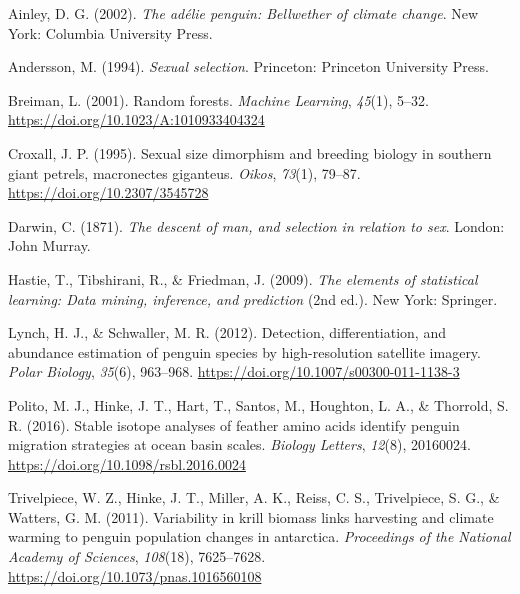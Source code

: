 \documentclass[
]{agujournal2019}
\newlength{\cslhangindent}
\newenvironment{CSLReferences}[2] %
 {\begin{list}{}{%
  \setlength{\itemindent}{0pt}
  \setlength{\leftmargin}{0pt}
  \setlength{\parsep}{0pt}
  \ifodd #1
   \setlength{\leftmargin}{\cslhangindent}
   \setlength{\itemindent}{-1\cslhangindent}
  \fi
  \setlength{\itemsep}{#2\baselineskip}}}
 {\end{list}}
\begin{document}
\label{refs}
\begin{CSLReferences}{1}{0}
\vspace{1em}

Ainley, D. G. (2002). \emph{The ad{é}lie penguin: Bellwether of climate
change}. New York: Columbia University Press.

Andersson, M. (1994). \emph{Sexual selection}. Princeton: Princeton
University Press.

Breiman, L. (2001). Random forests. \emph{Machine Learning},
\emph{45}(1), 5--32. \url{https://doi.org/10.1023/A:1010933404324}

Croxall, J. P. (1995). Sexual size dimorphism and breeding biology in
southern giant petrels, macronectes giganteus. \emph{Oikos},
\emph{73}(1), 79--87. \url{https://doi.org/10.2307/3545728}

Darwin, C. (1871). \emph{The descent of man, and selection in relation
to sex}. London: John Murray.

Hastie, T., Tibshirani, R., \& Friedman, J. (2009). \emph{The elements
of statistical learning: Data mining, inference, and prediction} (2nd
ed.). New York: Springer.

Lynch, H. J., \& Schwaller, M. R. (2012). Detection, differentiation,
and abundance estimation of penguin species by high-resolution satellite
imagery. \emph{Polar Biology}, \emph{35}(6), 963--968.
\url{https://doi.org/10.1007/s00300-011-1138-3}

Polito, M. J., Hinke, J. T., Hart, T., Santos, M., Houghton, L. A., \&
Thorrold, S. R. (2016). Stable isotope analyses of feather amino acids
identify penguin migration strategies at ocean basin scales.
\emph{Biology Letters}, \emph{12}(8), 20160024.
\url{https://doi.org/10.1098/rsbl.2016.0024}

Trivelpiece, W. Z., Hinke, J. T., Miller, A. K., Reiss, C. S.,
Trivelpiece, S. G., \& Watters, G. M. (2011). Variability in krill
biomass links harvesting and climate warming to penguin population
changes in antarctica. \emph{Proceedings of the National Academy of
Sciences}, \emph{108}(18), 7625--7628.
\url{https://doi.org/10.1073/pnas.1016560108}


\end{CSLReferences}
\end{document}
